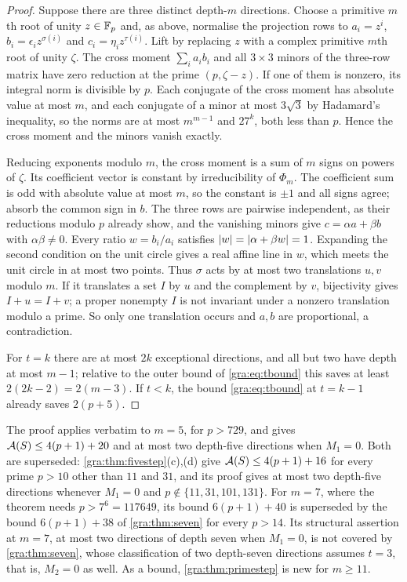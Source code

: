 \begin{proof}
Suppose there are three distinct depth-$m$ directions. Choose a primitive
$m$th root of unity $z\in\mathbb{F}_p$ and, as above, normalise the projection rows
to $a_i=z^i$, $b_i=\epsilon_iz^{\sigma(i)}$ and $c_i=\eta_iz^{\tau(i)}$.
Lift by replacing $z$ with a complex primitive $m$th root of unity
$\zeta$. The cross moment $\sum_ia_ib_i$ and all $3\times3$ minors of the
three-row matrix have zero reduction at the prime $(p,\zeta-z)$. If one of
them is nonzero, its integral norm is divisible by $p$. Each conjugate of
the cross moment has absolute value at most $m$, and each conjugate of a
minor at most $3\sqrt3$ by Hadamard's inequality, so the norms are at most
$m^{m-1}$ and $27^k$, both less than $p$. Hence the cross moment and the
minors vanish exactly.

Reducing exponents modulo $m$, the cross moment is a sum of $m$ signs on
powers of $\zeta$. Its coefficient vector is constant by irreducibility of
$\Phi_m$. The coefficient sum is odd with absolute value at most $m$, so
the constant is $\pm1$ and all signs agree; absorb the common sign in $b$.
The three rows are pairwise independent, as their reductions modulo $p$
already show, and the vanishing minors give $c=\alpha a+\beta b$ with
$\alpha\beta\ne0$. Every ratio $w=b_i/a_i$ satisfies
$\lvert w\rvert=\lvert\alpha+\beta w\rvert=1$. Expanding the second condition on the
unit circle gives a real affine line in $w$, which meets the unit circle
in at most two points. Thus $\sigma$ acts by at most two translations
$u,v$ modulo $m$. If it translates a set $I$ by $u$ and the complement by
$v$, bijectivity gives $I+u=I+v$; a proper nonempty $I$ is not invariant
under a nonzero translation modulo a prime. So only one translation
occurs and $a,b$ are proportional, a contradiction.

For $t=k$ there are at most $2k$ exceptional directions, and all but two
have depth at most $m-1$; relative to the outer bound of
\eqref{gra:eq:tbound} this saves at least $2(2k-2)=2(m-3)$. If $t<k$, the
bound \eqref{gra:eq:tbound} at $t=k-1$ already saves $2(p+5)$.
\end{proof}

\begin{remark}[The cases $m=5$ and $m=7$]
The proof applies verbatim to $m=5$, for $p>729$, and gives
$\mathcal{A}(S)\le4(p+1)+20$ and at most two depth-five directions when $M_1=0$.
Both are superseded: \cref{gra:thm:fivestep}(c),(d) give
$\mathcal{A}(S)\le4(p+1)+16$ for every prime $p>10$ other than $11$ and $31$, and
its proof gives at most two depth-five directions whenever $M_1=0$ and
$p\notin\{11,31,101,131\}$. For $m=7$, where the theorem needs
$p>7^6=117649$, its bound $6(p+1)+40$ is superseded by the bound $6(p+1)+38$
of \cref{gra:thm:seven} for every $p>14$. Its structural assertion at $m=7$,
at most two directions of depth seven when $M_1=0$, is not covered by
\cref{gra:thm:seven}, whose classification of two depth-seven directions
assumes $t=3$, that is, $M_2=0$ as well. As a bound, \cref{gra:thm:primestep}
is new for $m\ge11$.
\end{remark}


